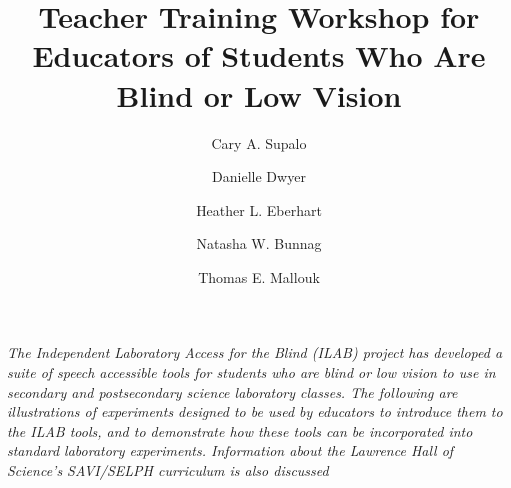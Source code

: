 \documentclass[11.5pt]{sig-alternate} %
\makeatletter
\let\oldabstract\abstract
\let\oldendabstract\endabstract
\renewenvironment{abstract} %
{\renewenvironment{quotation}%
               {\list{}{\addtolength{\leftmargin}{1em} %
                        \listparindent 1.5em%
                        \itemindent    \listparindent%
                        \rightmargin   \leftmargin%
                        \parsep        \z@ \@plus\p@}%
                \item\relax}%
               {\endlist}%
\oldabstract}
{\oldendabstract}
\makeatother
\begin{document}
\title{Teacher Training Workshop for Educators of Students Who Are Blind or Low Vision}

\author[1]{\large \color{blue}Cary A. Supalo}
\author[1]{\large \color{blue}Danielle Dwyer}
\author[1]{\large \color{blue}Heather L. Eberhart}
\author[1]{\large \color{blue}Natasha W. Bunnag}
\author[1]{\large \color{blue}Thomas E. Mallouk}


\toappear{}
\maketitle
\begin{@twocolumnfalse} 
\begin{abstract}
\item 
\textit{The Independent Laboratory Access for the Blind (ILAB) project has developed a suite of speech accessible tools for students who are blind or low vision to use in secondary and postsecondary science laboratory classes. The following are illustrations of experiments designed to be used by educators to introduce them to the ILAB tools, and to demonstrate how these tools can be incorporated into standard laboratory experiments. Information about the Lawrence Hall of Science’s SAVI/SELPH curriculum is also discussed}
\\ \\
\end{abstract}
\end{@twocolumnfalse}

\end{document}
